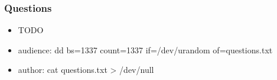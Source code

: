 \documentclass[serif,mathserif,aspectratio=43]{beamer}
\begin{document}

\begin{frame}
  \frametitle{Questions}
  \begin{itemize}
  \item TODO
  \item audience: dd bs=1337 count=1337 if=/dev/urandom of=questions.txt
  \item author: cat questions.txt > /dev/null
  \end{itemize}
\end{frame}
\end{document}
